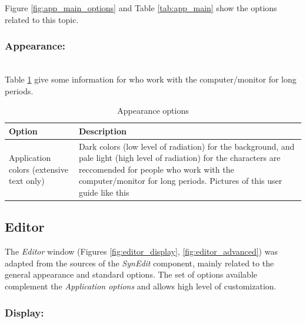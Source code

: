 Figure \ref{fig:app_main_options} and
Table \ref{tab:app_main}
show the options related to this topic.

\subsubsection{Appearance:}\\

Table \ref{tab:app_main_appearance} give some information for who work with the computer/monitor for long periods.

\begin{table}
  \begin{footnotesize}
    \begin{tabularx}{\headwidth}{>{\hsize=0.35\hsize}X>{\hsize=0.65\hsize}X}\\
      \hline
      \textbf{Option} & \textbf{Description} \\
      \hline
      Application colors (extensive text only) & Dark colors (low level of radiation)
       for the background, and pale light (high level of radiation) for the characters
       are reccomended for people who work with the computer/monitor for long periods.
       Pictures of this user guide like this \\
      \hline
    \end{tabularx}
  \end{footnotesize}
  \caption{Appearance options}
  \label{tab:app_main_appearance}
\end{table}


\hypertarget{working_editor}{}
\subsection{Editor}

The \textit{Editor} window
(Figures \ref{fig:editor_display}, \ref{fig:editor_advanced})
was adapted from the sources of the
\textit{SynEdit} component, mainly related to the general appearance and
standard options. The set of options available complement the
\textit{Application options} and allows high level of customization.


\hypertarget{working_editor_display}{}
\subsubsection{Display:}\\

